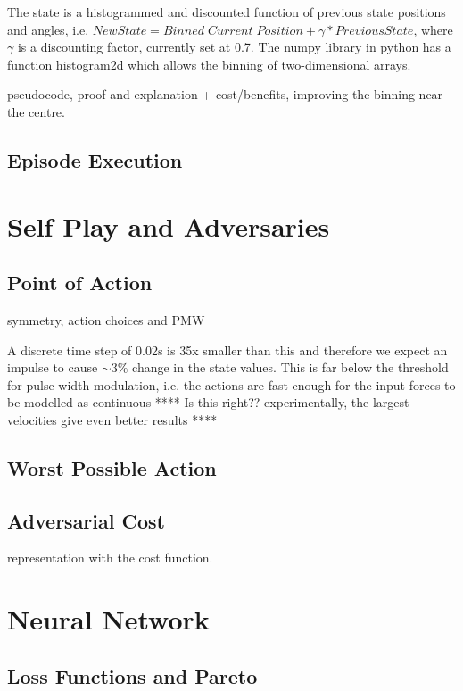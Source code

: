 \documentclass[main.tex]{subfiles}
\begin{document}
The state is a histogrammed and discounted function of previous state positions and angles, i.e. $New State = Binned \; Current \; Position + \gamma * Previous State$, where $\gamma$ is a discounting factor, currently set at 0.7. The numpy library in python has a function histogram2d which allows the binning of two-dimensional arrays.




pseudocode, proof and explanation + cost/benefits, improving the binning near the centre.

\subsection{Episode Execution}

\section{Self Play and Adversaries}

\subsection{Point of Action}
symmetry, action choices and PMW

A discrete time step of 0.02s is 35x smaller than this and therefore we expect an impulse to cause $\sim 3\%$ change in the state values. This is far below the threshold for pulse-width modulation, i.e. the actions are fast enough for the input forces to be modelled as continuous **** Is this right?? experimentally, the largest velocities give even better results ****

\subsection{Worst Possible Action}

\subsection{Adversarial Cost}
representation with the cost function.

\section{Neural Network}
\subsection{Loss Functions and Pareto}
\end{document}
